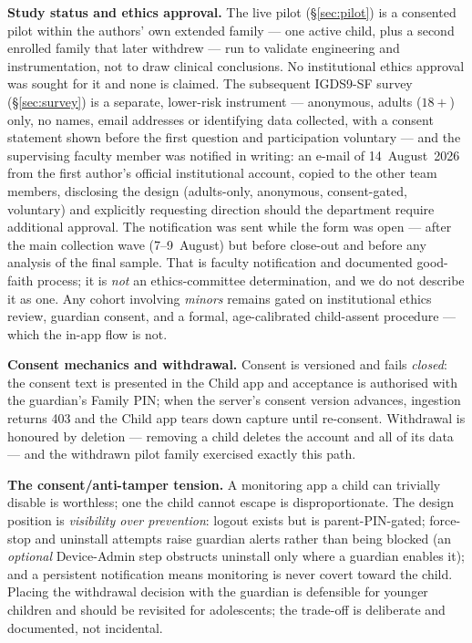 \documentclass[11pt,a4paper]{article}
\begin{document}
\textbf{Study status and ethics approval.} The live pilot
(\S\ref{sec:pilot}) is a consented pilot within the authors' own extended
family --- one active child, plus a second enrolled family that later withdrew
--- run to validate engineering and instrumentation, not to draw clinical
conclusions. No institutional ethics approval was sought for it and none is
claimed. The subsequent IGDS9-SF survey (\S\ref{sec:survey}) is a separate,
lower-risk instrument --- anonymous, adults ($18+$) only, no names, email
addresses or identifying data collected, with a consent statement shown before
the first question and participation voluntary --- and the supervising faculty
member was notified in writing: an e-mail of 14~August~2026 from the first
author's official institutional account, copied to the other team members, disclosing
the design (adults-only, anonymous, consent-gated, voluntary) and explicitly
requesting direction should the department require additional approval. The
notification was sent while the form was open --- after the main collection
wave (7--9~August) but before close-out and before any analysis of the final
sample. That is faculty notification and documented good-faith process; it is
\emph{not} an ethics-committee determination, and we do not describe it as one. Any cohort
involving \emph{minors} remains gated on institutional ethics review, guardian
consent, and a formal, age-calibrated child-assent procedure --- which the
in-app flow is not.

\textbf{Consent mechanics and withdrawal.} Consent is versioned and fails
\emph{closed}: the consent text is presented in the Child app and acceptance
is authorised with the guardian's Family PIN; when the server's consent
version advances, ingestion returns 403 and the Child app tears down capture
until re-consent. Withdrawal is honoured by deletion --- removing a child
deletes the account and all of its data --- and the withdrawn pilot family
exercised exactly this path.

\textbf{The consent/anti-tamper tension.} A monitoring app a child can
trivially disable is worthless; one the child cannot escape is
disproportionate. The design position is \emph{visibility over prevention}:
logout exists but is parent-PIN-gated; force-stop and uninstall attempts raise
guardian alerts rather than being blocked (an \emph{optional} Device-Admin
step obstructs uninstall only where a guardian enables it); and a persistent
notification means monitoring is never covert toward the child. Placing the
withdrawal decision with the guardian is defensible for younger children and
should be revisited for adolescents; the trade-off is deliberate and
documented, not incidental.
\end{document}
